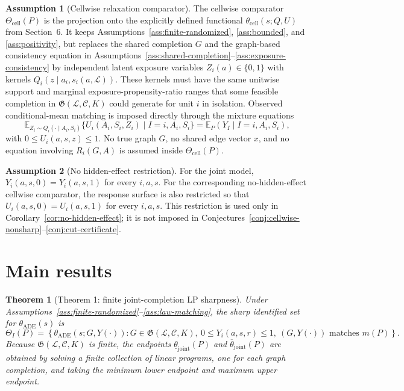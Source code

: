 \documentclass[11pt]{article}
\newcommand{\E}{\mathbb{E}}
\theoremstyle{definition}
\newtheorem{assumption}{Assumption}
\theoremstyle{plain}
\newtheorem{theorem}{Theorem}
\theoremstyle{remark}
\begin{document}
\begin{assumption}[Cellwise relaxation comparator]\label{ass:cellwise-comparator}
The cellwise comparator \(\Theta_{\mathrm{cell}}(P)\) is the projection onto the explicitly defined functional \(\theta_{\mathrm{cell}}(s;Q,U)\) from Section~6.  It keeps Assumptions~\ref{ass:finite-randomized}, \ref{ass:bounded}, and \ref{ass:positivity}, but replaces the shared completion \(G\) and the graph-based consistency equation in Assumptions~\ref{ass:shared-completion}--\ref{ass:exposure-consistency} by independent latent exposure variables \(Z_i(a)\in\{0,1\}\) with kernels \(Q_i(z\mid a_i,s_i(a,\mathcal L))\).  These kernels must have the same unitwise support and marginal exposure-propensity-ratio ranges that some feasible completion in \(\mathfrak G(\mathcal L,\mathcal C,K)\) could generate for unit \(i\) in isolation.  Observed conditional-mean matching is imposed directly through the mixture equations
\[
\E_{Z_i\sim Q_i(\cdot\mid A_i,S_i)}
  \{U_i(A_i,S_i,Z_i)\mid I=i,A_i,S_i\}
=
\E_P(Y_I\mid I=i,A_i,S_i),
\]
with \(0\le U_i(a,s,z)\le1\).  No true graph \(G\), no shared edge vector \(x\), and no equation involving \(R_i(G,A)\) is assumed inside \(\Theta_{\mathrm{cell}}(P)\).
\end{assumption}

\begin{assumption}[No hidden-effect restriction]\label{ass:no-hidden-effect}
For the joint model, \(Y_i(a,s,0)=Y_i(a,s,1)\) for every \(i,a,s\).  For the corresponding no-hidden-effect cellwise comparator, the response surface is also restricted so that \(U_i(a,s,0)=U_i(a,s,1)\) for every \(i,a,s\).  This restriction is used only in Corollary~\ref{cor:no-hidden-effect}; it is not imposed in Conjectures~\ref{conj:cellwise-nonsharp}--\ref{conj:cut-certificate}.
\end{assumption}

\section{Main results}
\begin{theorem}[Theorem 1: finite joint-completion LP sharpness]\label{thm:joint-lp-sharp}
Under Assumptions~\ref{ass:finite-randomized}--\ref{ass:law-matching}, the sharp identified set for \(\theta_{\mathrm{ADE}}(s)\) is
\[
\Theta_I(P)
=
\left\{
\theta_{\mathrm{ADE}}(s;G,Y(\cdot)):
G\in\mathfrak G(\mathcal L,\mathcal C,K),\
0\le Y_i(a,s,r)\le1,\
(G,Y(\cdot))\text{ matches }m(P)
\right\}.
\]
Because \(\mathfrak G(\mathcal L,\mathcal C,K)\) is finite, the endpoints
\(\underline\theta_{\mathrm{joint}}(P)\) and \(\overline\theta_{\mathrm{joint}}(P)\) are obtained by solving a finite collection of linear programs, one for each graph completion, and taking the minimum lower endpoint and maximum upper endpoint.
\end{theorem}
\end{document}

